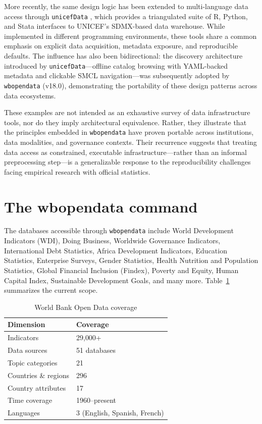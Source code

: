 \documentclass[bib]{statapress}
\begin{document}
More recently, the same design logic has been extended to multi-language data
access through \texttt{unicefData} \citep{unicefdata2026}, which provides a triangulated suite of R, Python,
and Stata interfaces to UNICEF's SDMX-based data warehouse. While implemented in
different programming environments, these tools share a common emphasis on
explicit data acquisition, metadata exposure, and reproducible defaults.
The influence has also been bidirectional: the discovery architecture introduced
by \texttt{unicefData}---offline catalog browsing with YAML-backed metadata and
clickable SMCL navigation---was subsequently adopted by \texttt{wbopendata}
(v18.0), demonstrating the portability of these design patterns across data
ecosystems.

These examples are not intended as an exhaustive survey of data infrastructure
tools, nor do they imply architectural equivalence. Rather, they illustrate that the
principles embedded in \texttt{wbopendata} have proven portable across institutions,
data modalities, and governance contexts. Their recurrence suggests that treating
data access as constrained, executable infrastructure—rather than an informal
preprocessing step—is a generalizable response to the reproducibility challenges
facing empirical research with official statistics.

\section{The wbopendata command}\label{sec:command}

The databases accessible through \texttt{wbopendata} include World Development Indicators (WDI), Doing Business, Worldwide Governance Indicators, International Debt Statistics, Africa Development Indicators, Education Statistics, Enterprise Surveys, Gender Statistics, Health Nutrition and Population Statistics, Global Financial Inclusion (Findex), Poverty and Equity, Human Capital Index, Sustainable Development Goals, and many more. Table~\ref{tab:coverage} summarizes the current scope.

\begin{table}[H]
\centering
\caption{World Bank Open Data coverage}
\label{tab:coverage}
\begin{tabular}{ll}
\hline
Dimension & Coverage \\
\hline
Indicators & 29{,}000+ \\
Data sources & 51 databases \\
Topic categories & 21 \\
Countries \& regions & 296 \\
Country attributes & 17 \\
Time coverage & 1960--present \\
Languages & 3 (English, Spanish, French) \\
\hline
\end{tabular}
\end{table}
\end{document}
